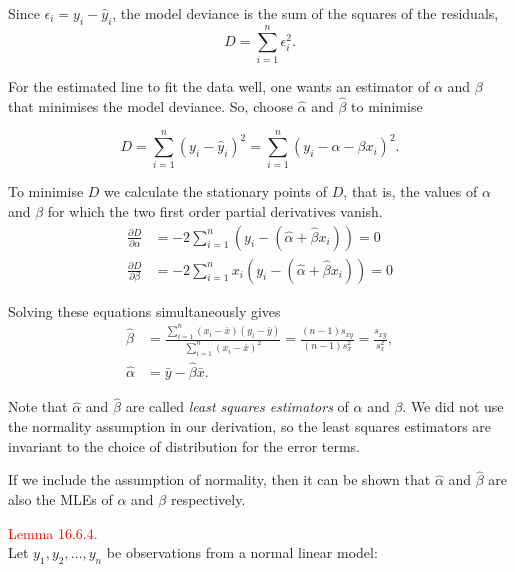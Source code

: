 \documentclass[
]{book}
\begin{document}
Since \(\epsilon_i = y_{i}-\hat{y}_i\), the model deviance is the sum of the squares of the residuals,
\[ D = \sum_{i=1}^n \epsilon_i^2.\]

For the estimated line to fit the data well, one wants an estimator of \(\alpha\) and \(\beta\) that minimises the model deviance. So, choose \(\hat{\alpha}\) and \(\hat{\beta}\) to minimise

\[D = \sum\limits_{i=1}^{n} \left(y_{i}-\hat{y}_i\right)^{2} = \sum\limits_{i=1}^n \left( y_i-\alpha-\beta x_i \right)^2.\]

To minimise \(D\) we calculate the stationary points of \(D\), that is, the values of \(\alpha\) and \(\beta\) for which the two first order partial derivatives vanish.\\

\begin{align*}
\frac{\partial D}{\partial \alpha} &= -2 \sum\limits_{i=1}^n \left(y_i- \left( \hat{\alpha} + \hat{\beta}x_i \right) \right) = 0 \\[3pt]
\frac{\partial D}{\partial \beta} &= -2 \sum\limits_{i=1}^n x_i \left(y_i - \left( \hat{\alpha} + \hat{\beta} x_i \right) \right) = 0
\end{align*}

Solving these equations simultaneously gives\\

\begin{align*}
\hat{\beta} &= \frac{ \sum\limits_{i=1}^n \left( x_i-\bar{x} \right) \left( y_i-\bar{y} \right) }{ \sum\limits_{i=1}^n  \left( x_i-\bar{x} \right)^2} = \frac{(n-1)s_{xy}}{(n-1)s_x^2} = \frac{s_{xy}}{s_x^2}, \\[3pt]
\hat{\alpha} &= \bar{y} - \hat{\beta}\bar{x}.
\end{align*}

Note that \(\hat{\alpha}\) and \(\hat{\beta}\) are called \emph{least squares estimators} of \(\alpha\) and \(\beta\). We did not use the normality assumption in our derivation, so the least squares estimators are invariant to the choice of distribution for the error terms.

If we include the assumption of normality, then it can be shown that \(\hat{\alpha}\) and \(\hat{\beta}\) are also the MLEs of \(\alpha\) and \(\beta\) respectively.

\hypertarget{Sec_LinearI:lem:MLE}{}
\textcolor{red}{Lemma 16.6.4.}\\
Let \(y_1, y_2, \ldots, y_n\) be observations from a normal linear model:\\
\end{document}
